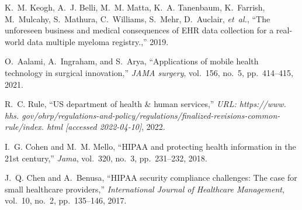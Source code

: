 \documentclass{article}
\begin{document}
\begin{thebibliography}{100}
	K.~M. Keogh, A.~J. Belli, M.~M. Matta, K.~A. Tanenbaum, K.~Farrish, M.~Mulcahy,
	S.~Mathura, C.~Williams, S.~Mehr, D.~Auclair, {\em et~al.}, ``The unforeseen
	business and medical consequences of {EHR} data collection for a real-world
	data multiple myeloma registry.,'' 2019.
	
	O.~Aalami, A.~Ingraham, and S.~Arya, ``Applications of mobile health technology
	in surgical innovation,'' {\em JAMA surgery}, vol.~156, no.~5, pp.~414--415,
	2021.
	
	R.~C. Rule, ``{US} department of health \& human services,'' {\em URL:
		https://www. hhs.
		gov/ohrp/regulations-and-policy/regulations/finalized-revisions-common-rule/index.
		html [accessed 2022-04-10]}, 2022.
	
	I.~G. Cohen and M.~M. Mello, ``{HIPAA} and protecting health information in the
	21st century,'' {\em Jama}, vol.~320, no.~3, pp.~231--232, 2018.
	
	J.~Q. Chen and A.~Benusa, ``{HIPAA} security compliance challenges: The case
	for small healthcare providers,'' {\em International Journal of Healthcare
		Management}, vol.~10, no.~2, pp.~135--146, 2017.
	
\end{thebibliography}



\end{document}
